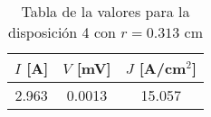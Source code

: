 \begin{table}[h!]
    \centering
\begin{tabular}{ccc}
\toprule
$I$ [A] & $V$ [mV] & $J$ [A/cm$^2$] \\
\midrule
2.963 & 0.0013 & 15.057 \\
\bottomrule
\end{tabular}
    \caption{Tabla de la valores para la disposición 4 con $r=0.313$ cm}
    \label{Tab:VIJ_mini_4}
\end{table}

